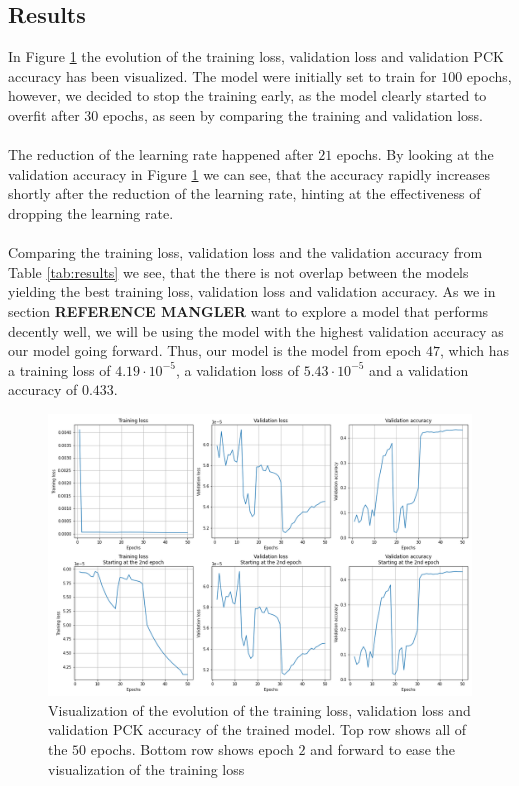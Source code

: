 \documentclass[./main.tex]{subfiles}
\begin{document}
\subsection{Results}
In Figure \ref{fig:results} the evolution of the training loss, validation loss and validation PCK accuracy has been visualized. The model were initially set to train for $100$ epochs, however, we decided to stop the training early, as the model clearly started to overfit after $30$ epochs, as seen by comparing the training and validation loss.
\\
\\
The reduction of the learning rate happened after $21$ epochs. By looking at the validation accuracy in Figure \ref{fig:results} we can see, that the accuracy rapidly increases shortly after the reduction of the learning rate, hinting at the effectiveness of dropping the learning rate. 
\\
\\
Comparing the training loss, validation loss and the validation accuracy from Table \ref{tab:results} we see, that the there is not overlap between the models yielding the best training loss, validation loss and validation accuracy. As we in section \textbf{REFERENCE MANGLER} want to explore a model that performs decently well, we will be using the model with the highest validation accuracy as our model going forward. Thus, our model is the model from epoch $47$, which has a training loss of $4.19 \cdot 10^{-5}$, a validation loss of $5.43 \cdot 10^{-5}$ and a validation accuracy of $0.433$.

\begin{figure}[t]
    \centering
    \includegraphics[width = \textwidth]{entities/results.png}
    \caption{Visualization of the evolution of the training loss, validation loss and validation PCK accuracy of the trained model. Top row shows all of the $50$ epochs. Bottom row shows epoch $2$ and forward to ease the visualization of the training loss}
    \label{fig:results}
\end{figure}
\end{document}
